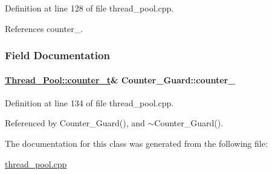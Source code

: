 Definition at line 128 of file thread\_\-pool.cpp.

References counter\_\-.

\subsubsection{Field Documentation}
\hypertarget{classCounter__Guard_Counter__Guardn0}{
\paragraph[counter\_\-]{\setlength{\rightskip}{0pt plus 5cm}\hyperlink{classThread__Pool_Thread__Pools1}{Thread\_\-Pool::counter\_\-t}\& Counter\_\-Guard::counter\_\-}\hfill}
\label{classCounter__Guard_Counter__Guardn0}




Definition at line 134 of file thread\_\-pool.cpp.

Referenced by Counter\_\-Guard(), and $\sim$Counter\_\-Guard().

The documentation for this class was generated from the following file:\begin{CompactItemize}
\item 
\hyperlink{thread__pool_8cpp}{thread\_\-pool.cpp}\end{CompactItemize}

